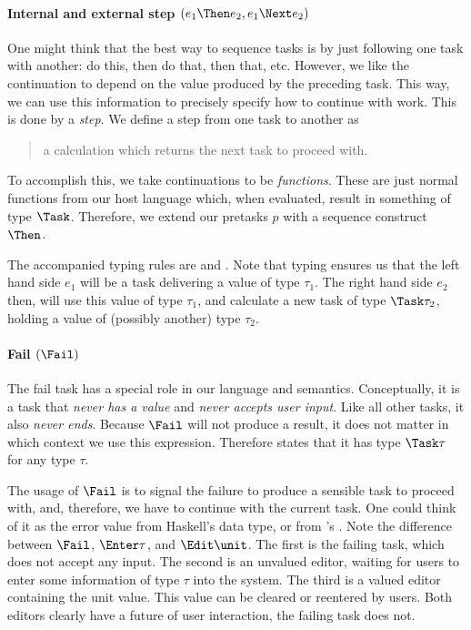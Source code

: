 \paragraph{Internal and external step $(e_1 \Then e_2, e_1 \Next e_2)$}

One might think that the best way to sequence tasks is by just following one task with another:
do this, then do that, then that, etc.
However, we like the continuation to depend on the value produced by the preceding task.
This way, we can use this information to precisely specify how to continue with work.
This is done by a \emph{step}.
We define a step from one task to another as
\begin{quote}
  a calculation which returns the next task to proceed with.
\end{quote}

To accomplish this,
we take continuations to be \emph{functions}.
These are just normal functions from our host language which,
when evaluated, result in something of type $\Task$.
Therefore,
we extend our pretasks $p$ with a sequence construct $\Then$.

The accompanied typing rules are  and .
Note that typing ensures us that the left hand side $e_1$ will be a task delivering a value of type $\tau_1$.
The right hand side $e_2$ then, will use this value of type $\tau_1$,
and calculate a new task of type $\Task \tau_2$,
holding a value of (possibly another) type $\tau_2$.



\paragraph{Fail $(\Fail)$}

The fail task has a special role in our language and semantics.
Conceptually, it is a task that \emph{never has a value} and \emph{never accepts user input}.
Like all other tasks, it also \emph{never ends}.
Because $\Fail$ will not produce a result,
it does not matter in which context we use this expression.
Therefore  states that it has type $\Task \tau$ for any type $\tau$.

The usage of $\Fail$ is to signal the failure to produce a sensible task to proceed with,
and, therefore, we have to continue with the current task.
One could think of it as the error value  from Haskell's  data type,
or  from \ML's .
Note the difference between $\Fail$, $\Enter \tau$, and $\Edit \unit$.
The first is the failing task, which does not accept any input.
The second is an unvalued editor,
waiting for users to enter some information of type $\tau$ into the system.
The third is a valued editor containing the unit value.
This value can be cleared or reentered by users.
Both editors clearly have a future of user interaction,
the failing task does not.



